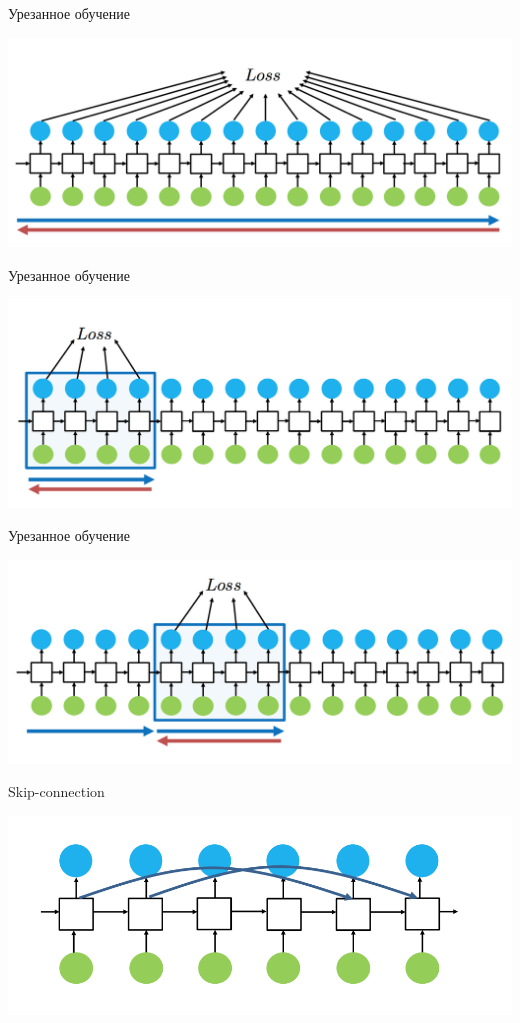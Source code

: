 \documentclass[notes,12pt, aspectratio=169]{beamer}
\begin{document}
\begin{frame}{Урезанное обучение}
\begin{center}
	\includegraphics[width=.9\linewidth]{rnn10.png}
\end{center}
\end{frame}


\begin{frame}{Урезанное обучение}
\begin{center}
	\includegraphics[width=.9\linewidth]{rnn11.png}
\end{center}
\end{frame}


\begin{frame}{Урезанное обучение}
\begin{center}
	\includegraphics[width=.9\linewidth]{rnn12.png}
\end{center}
\end{frame}


\begin{frame}{Skip-connection}
\begin{center}
	\includegraphics[width=.9\linewidth]{rnn13.png}
\end{center}
\end{frame}
\end{document}
